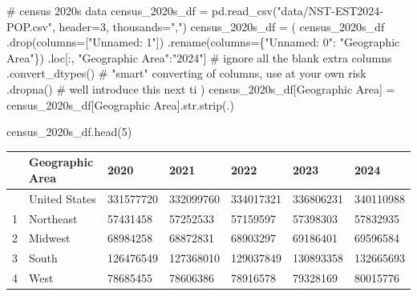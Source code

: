 \documentclass[
  letterpaper,
  DIV=11,
  numbers=noendperiod]{scrreprt}
\newenvironment{Shaded}{\begin{snugshade}}{\end{snugshade}}
\newcommand{\BuiltInTok}[1]{\textcolor[rgb]{0.00,0.23,0.31}{#1}}
\newcommand{\CommentTok}[1]{\textcolor[rgb]{0.37,0.37,0.37}{#1}}
\newcommand{\DecValTok}[1]{\textcolor[rgb]{0.68,0.00,0.00}{#1}}
\newcommand{\NormalTok}[1]{\textcolor[rgb]{0.00,0.23,0.31}{#1}}
\newcommand{\OperatorTok}[1]{\textcolor[rgb]{0.37,0.37,0.37}{#1}}
\newcommand{\StringTok}[1]{\textcolor[rgb]{0.13,0.47,0.30}{#1}}
\begin{document}
\begin{Shaded}
\begin{Highlighting}[]
\CommentTok{\# census 2020s data}
\NormalTok{census\_2020s\_df }\OperatorTok{=}\NormalTok{ pd.read\_csv(}\StringTok{"data/NST{-}EST2024{-}POP.csv"}\NormalTok{, header}\OperatorTok{=}\DecValTok{3}\NormalTok{, thousands}\OperatorTok{=}\StringTok{","}\NormalTok{)}
\NormalTok{census\_2020s\_df }\OperatorTok{=}\NormalTok{ (}
\NormalTok{    census\_2020s\_df}
\NormalTok{    .drop(columns}\OperatorTok{=}\NormalTok{[}\StringTok{"Unnamed: 1"}\NormalTok{])}
\NormalTok{    .rename(columns}\OperatorTok{=}\NormalTok{\{}\StringTok{"Unnamed: 0"}\NormalTok{: }\StringTok{"Geographic Area"}\NormalTok{\})}
\NormalTok{    .loc[:, }\StringTok{"Geographic Area"}\NormalTok{:}\StringTok{"2024"}\NormalTok{] }\CommentTok{\# ignore all the blank extra columns}
\NormalTok{    .convert\_dtypes()                 }\CommentTok{\# "smart" converting of columns, use at your own risk}
\NormalTok{    .dropna()                         }\CommentTok{\# we\textquotesingle{}ll introduce this next ti}
\NormalTok{)}
\NormalTok{census\_2020s\_df[}\StringTok{\textquotesingle{}Geographic Area\textquotesingle{}}\NormalTok{] }\OperatorTok{=}\NormalTok{ census\_2020s\_df[}\StringTok{\textquotesingle{}Geographic Area\textquotesingle{}}\NormalTok{].}\BuiltInTok{str}\NormalTok{.strip(}\StringTok{\textquotesingle{}.\textquotesingle{}}\NormalTok{)}

\NormalTok{census\_2020s\_df.head(}\DecValTok{5}\NormalTok{)}
\end{Highlighting}
\end{Shaded}

\begin{longtable}[]{@{}lllllll@{}}
\toprule\noalign{}
& Geographic Area & 2020 & 2021 & 2022 & 2023 & 2024 \\
\midrule\noalign{}
\endhead
\bottomrule\noalign{}
\endlastfoot
0 & United States & 331577720 & 332099760 & 334017321 & 336806231 &
340110988 \\
1 & Northeast & 57431458 & 57252533 & 57159597 & 57398303 & 57832935 \\
2 & Midwest & 68984258 & 68872831 & 68903297 & 69186401 & 69596584 \\
3 & South & 126476549 & 127368010 & 129037849 & 130893358 & 132665693 \\
4 & West & 78685455 & 78606386 & 78916578 & 79328169 & 80015776 \\
\end{longtable}
\end{document}

